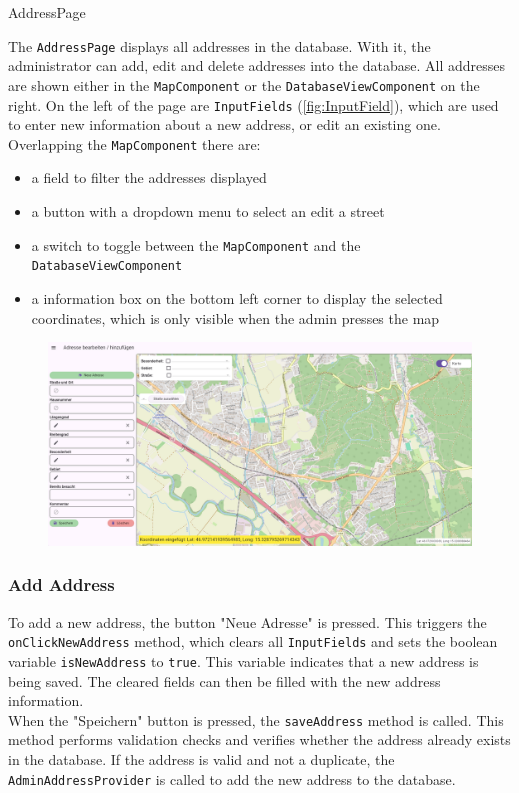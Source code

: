 \begin{subsection}{AddressPage}

The \texttt{AddressPage} displays all addresses in the database. With it, the administrator can add, edit and delete addresses into the database. All addresses are shown either in the \texttt{MapComponent} or the \texttt{DatabaseViewComponent} on the right. On the left of the page are \texttt{InputFields} (\ref{fig:InputField}), which are used to enter new information about a new address, or edit an existing one. Overlapping the \texttt{MapComponent} there are:
\begin{itemize}
  \item a field to filter the addresses displayed
  \item a button with a dropdown menu to select an edit a street
  \item a switch to toggle between the \texttt{MapComponent} and the \texttt{DatabaseViewComponent}
  \item a information box on the bottom left corner to display the selected coordinates, which is only visible when the admin presses the map
\end{itemize}

\begin{figure}[H]
    \centering
    \includegraphics[width=0.9\linewidth]{images/AdminPanel/AddressPage.png}
\end{figure}
\end{subsection}


\subsubsection{Add Address}
To add a new address, the button "Neue Adresse" is pressed. This triggers the \texttt{onClickNewAddress} method, which clears all \texttt{InputFields} and sets the boolean variable \texttt{isNewAddress} to \texttt{true}. This variable indicates that a new address is being saved. The cleared fields can then be filled with the new address information.\\When the "Speichern" button is pressed, the \texttt{saveAddress} method is called. This method performs validation checks and verifies whether the address already exists in the database. If the address is valid and not a duplicate, the \texttt{AdminAddressProvider} is called to add the new address to the database.


